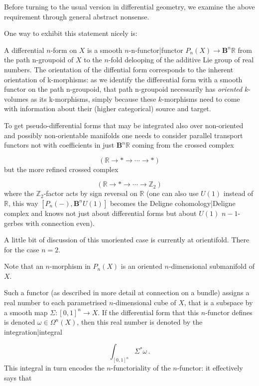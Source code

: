 \documentclass[preprint, 5p, 10pt]{elsarticle}
\theoremstyle{plain}
\begin{document}
Before turning to the usual version in differential geometry, we examine the above requirement through general abstract nonsense.

One way to exhibit this statement nicely is:

A differential $n$-form on $X$ is a smooth $n$-n-functor|functor $P_n(X) \to \mathbf{B}^n \mathbb{R}$ from the path n-groupoid of $X$ to the $n$-fold delooping of the additive Lie group of real numbers.
The orientation of the diffential form corresponds to the inherent orientation of k-morphisms: as we identify the differential form with a smooth functor on the path n-groupoid, that path n-groupoid necessarily has \emph{oriented} $k$-volumes as its k-morphisms, simply because these $k$-morphisms need to come with information about their (higher categorical) source and target.

To get pseudo-differential forms that may be integrated also over non-oriented and possibly non-orientable manifolds one needs to consider parallel transport functors not with coefficients in just $\mathbf{B}^n \mathbb{R}$ coming from the crossed complex

\begin{displaymath}
(\mathbb{R} \to {*} \to \cdots \to {*})
\end{displaymath}
but the more refined crossed complex

\begin{displaymath}
(\mathbb{R} \to {*} \to \cdots \to \mathbb{Z}_2)
\end{displaymath}
where the $\mathbb{Z}_2$-factor acts by sign reversal on $\mathbb{R}$ (one can also use $U(1)$ instead of $\mathbb{R}$, this way $[P_n(-), \mathbf{B}^n U(1)]$ becomes the Deligne cohomology|Deligne complex and knows not just about differential forms but about $U(1)$ $n-1$-gerbes with connection even).

A little bit of discussion of this unoriented case is currently at orientifold. There for the case $n=2$.

Note that an $n$-morphism in $P_n(X)$ is an oriented $n$-dimensional submanifold of $X$.

Such a functor (as described in more detail at connection on a bundle) assigns a real number to each parametrised $n$-dimensional cube of $X$, that is a subspace by a smooth map $\Sigma : [0,1]^n \to X$. If the differential form that this $n$-functor defines is denoted $\omega \in \Omega^n(X)$, then this real number is denoted by the integration|integral

\begin{displaymath}
\int_{[0,1]^n} \Sigma^* \omega
  \,.
\end{displaymath}
This integral in turn encodes the $n$-functoriality of the $n$-functor: it effectively says that
\end{document}
